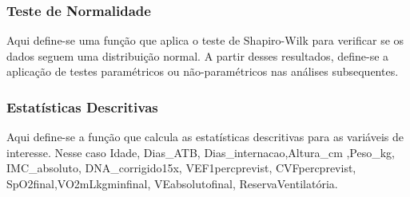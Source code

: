 \documentclass[
]{article}
\newenvironment{Shaded}{\begin{snugshade}}{\end{snugshade}}
\newcommand{\AttributeTok}[1]{\textcolor[rgb]{0.77,0.63,0.00}{#1}}
\newcommand{\ControlFlowTok}[1]{\textcolor[rgb]{0.13,0.29,0.53}{\textbf{#1}}}
\newcommand{\FunctionTok}[1]{\textcolor[rgb]{0.00,0.00,0.00}{#1}}
\newcommand{\NormalTok}[1]{#1}
\newcommand{\OtherTok}[1]{\textcolor[rgb]{0.56,0.35,0.01}{#1}}
\newcommand{\SpecialCharTok}[1]{\textcolor[rgb]{0.00,0.00,0.00}{#1}}
\newcommand{\StringTok}[1]{\textcolor[rgb]{0.31,0.60,0.02}{#1}}
\begin{document}
\hypertarget{teste-de-normalidade}{%
\subsubsection{Teste de Normalidade}\label{teste-de-normalidade}}

Aqui define-se uma função que aplica o teste de Shapiro-Wilk para
verificar se os dados seguem uma distribuição normal. A partir desses
resultados, define-se a aplicação de testes paramétricos ou
não-paramétricos nas análises subsequentes.

\begin{Shaded}
\end{Shaded}

\hypertarget{estatuxedsticas-descritivas}{%
\subsubsection{Estatísticas
Descritivas}\label{estatuxedsticas-descritivas}}

Aqui define-se a função que calcula as estatísticas descritivas para as
variáveis de interesse. Nesse caso Idade, Dias\_ATB,
Dias\_internacao,Altura\_cm ,Peso\_kg, IMC\_absoluto, DNA\_corrigido15x,
VEF1percprevist, CVFpercprevist, SpO2final,VO2mLkgminfinal,
VEabsolutofinal, ReservaVentilatória.
\end{document}
